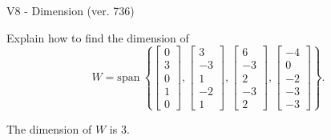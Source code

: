 \begin{exercise}
  \begin{exerciseTitle}V8 - Dimension (ver. 736)\end{exerciseTitle}
  \begin{exerciseStatement}
    Explain how to find the dimension of 
\[W=\mathrm{span}\ \left\{\left[\begin{array}{r}
0 \\
3 \\
0 \\
1 \\
0
\end{array}\right] , \left[\begin{array}{r}
3 \\
-3 \\
1 \\
-2 \\
1
\end{array}\right] , \left[\begin{array}{r}
6 \\
-3 \\
2 \\
-3 \\
2
\end{array}\right] , \left[\begin{array}{r}
-4 \\
0 \\
-2 \\
-3 \\
-3
\end{array}\right]\right\}.\]



  \end{exerciseStatement}
  \begin{exerciseAnswer}
   The dimension of \(W\) is  \(3\).
  


  \end{exerciseAnswer}
\end{exercise}